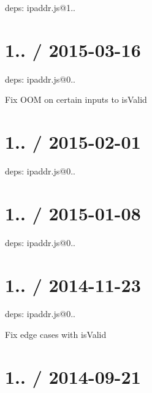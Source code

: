 \begin{DoxyItemize}
\item deps\+: ipaddr.\+js@1..
\end{DoxyItemize}

\section*{1.. / 2015-\/03-\/16 }


\begin{DoxyItemize}
\item deps\+: ipaddr.\+js@0..
\begin{DoxyItemize}
\item Fix O\+OM on certain inputs to {\ttfamily is\+Valid}
\end{DoxyItemize}
\end{DoxyItemize}

\section*{1.. / 2015-\/02-\/01 }


\begin{DoxyItemize}
\item deps\+: ipaddr.\+js@0..
\end{DoxyItemize}

\section*{1.. / 2015-\/01-\/08 }


\begin{DoxyItemize}
\item deps\+: ipaddr.\+js@0..
\end{DoxyItemize}

\section*{1.. / 2014-\/11-\/23 }


\begin{DoxyItemize}
\item deps\+: ipaddr.\+js@0..
\begin{DoxyItemize}
\item Fix edge cases with {\ttfamily is\+Valid}
\end{DoxyItemize}
\end{DoxyItemize}

\section*{1.. / 2014-\/09-\/21 }


